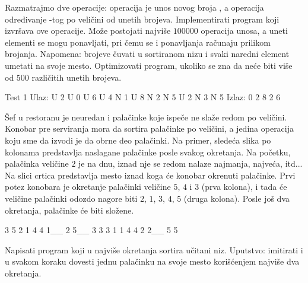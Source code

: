 \begin{Exercise}[difficulty=2, label=514]
  Razmatrajmo dve operacije: operacija  je unos novog broja
  , a operacija  određivanje -tog po
  veličini od unetih brojeva. Implementirati program koji izvršava ove
  operacije. Može postojati najviše $100000$ operacija unosa, a uneti
  elementi se mogu ponavljati, pri čemu se i ponavljanja računaju
  prilikom brojanja. Napomena: brojeve čuvati u sortiranom nizu i
  svaki naredni element umetati na svoje mesto. Optimizovati program,
  ukoliko se zna da neće biti više od $500$ različitih unetih brojeva.
  
\begin{maxitest}
\begin{test}{Test 1}
Ulaz: U 2 U 0 U 6 U 4 N 1 U 8 N 2 N 5 U 2 N 3 N 5
Izlaz: 0 2 8 2 6
\end{test}
\end{maxitest}
  
\end{Exercise}



\begin{Exercise}[difficulty=2, label=516]
  Šef u restoranu je neuredan i palačinke koje ispeče ne slaže redom
  po veličini. Konobar pre serviranja mora da sortira palačinke po
  veličini, a jedina operacija koju sme da izvodi je da obrne deo
  palačinki. Na primer, sledeća slika po kolonama predstavlja
  naslagane palačinke posle svakog okretanja. Na početku, palačinka
  veličine $2$ je na dnu, iznad nje se redom nalaze najmanja, najveća,
  itd... Na slici crtica predstavlja mesto iznad koga će konobar
  okrenuti palačinke. Prvi potez konobara je okretanje palačinki
  veličine $5$, $4$ i $3$ (prva kolona), i tada će veličine palačinki
  odozdo nagore biti $2$, $1$, $3$, $4$, $5$ (druga kolona). Posle još
  dva okretanja, palačinke će biti složene.
\begin{ckod}
    3    5    2    1
    4    4    1__  2
    5__  3    3    3
    1    1    4    4
    2    2__  5    5
\end{ckod}
Napisati program koji u najviše  okretanja sortira učitani
niz. Uputstvo: imitirati  i u svakom koraku
dovesti jednu palačinku na svoje mesto korišćenjem najviše dva
okretanja.
    
\end{Exercise}

